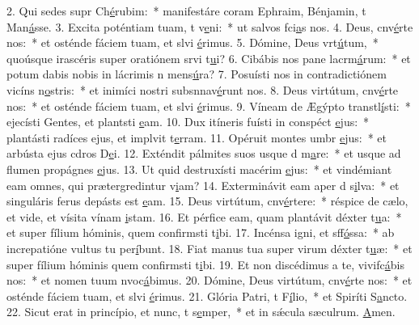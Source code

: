 2. Qui sedes supr Ch\uline{é}rubim:~* manifestáre coram Ephraim, Bénjamin, t Man\uline{á}sse.
3. Excita poténtiam tuam, t v\uline{e}ni:~* ut salvos fci\uline{a}s nos.
4. Deus, cnv\uline{é}rte nos:~* et osténde fáciem tuam, et slvi \uline{é}rimus.
5. Dómine, Deus vrt\uline{ú}tum,~* quoúsque irascéris super oratiónem srvi t\uline{u}i?
6. Cibábis nos pane lacrm\uline{á}rum:~* et potum dabis nobis in lácrimis n mens\uline{ú}ra?
7. Posuísti nos in contradictiónem vicíns n\uline{o}stris:~* et inimíci nostri subsnnav\uline{é}runt nos.
8. Deus virtútum, cnv\uline{é}rte nos:~* et osténde fáciem tuam, et slvi \uline{é}rimus.
9. Víneam de Ægýpto transtl\uline{í}sti:~* ejecísti Gentes, et plantsti \uline{e}am.
10. Dux itíneris fuísti in conspéct \uline{e}jus:~* plantásti radíces ejus, et implvit t\uline{e}rram.
11. Opéruit montes umbr \uline{e}jus:~* et arbústa ejus cdros D\uline{e}i.
12. Exténdit pálmites suos usque d m\uline{a}re:~* et usque ad flumen propágnes \uline{e}jus.
13. Ut quid destruxísti macérim \uline{e}jus:~* et vindémiant eam omnes, qui prætergredintur v\uline{i}am?
14. Exterminávit eam aper d s\uline{i}lva:~* et singuláris ferus depásts est \uline{e}am.
15. Deus virtútum, cnv\uline{é}rtere:~* réspice de cælo, et vide, et vísita vínam \uline{i}stam.
16. Et pérfice eam, quam plantávit déxter t\uline{u}a:~* et super fílium hóminis, quem confirmsti t\uline{i}bi.
17. Incénsa igni, et sff\uline{ó}ssa:~* ab increpatióne vultus tu per\uline{í}bunt.
18. Fiat manus tua super virum déxter t\uline{u}æ:~* et super fílium hóminis quem confirmsti t\uline{i}bi.
19. Et non discédimus a te, vivifc\uline{á}bis nos:~* et nomen tuum nvoc\uline{á}bimus.
20. Dómine, Deus virtútum, cnv\uline{é}rte nos:~* et osténde fáciem tuam, et slvi \uline{é}rimus.
21. Glória Patri, t F\uline{í}lio,~* et Spiríti S\uline{a}ncto.
22. Sicut erat in princípio, et nunc, t s\uline{e}mper,~* et in sǽcula sæculrum. \uline{A}men.
